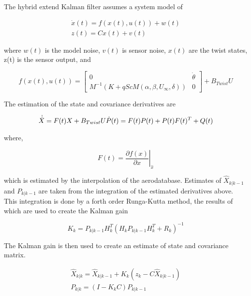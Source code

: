 \documentclass[11pt]{ucthesis}
\begin{document}
The hybrid extend Kalman filter assumes a system model of 

\begin{equation}
\begin{matrix}
\dot{x}(t) = f(x(t),u(t))+w(t)\\
z(t) = Cx(t)+v(t)
\end{matrix}
\end{equation}

where $w(t)$ is the model noise, $v(t)$ is sensor noise, $x(t)$ are the twist states, z(t) is the sensor output, and 

\begin{equation}
f(x(t),u(t)) = \begin{bmatrix}
0&\dot{\theta}\\
M^{-1}(K+qScM(\alpha,\beta,U_{\infty},\delta))&0\end{bmatrix}+B_{Twist}U
\end{equation}

The estimation of the state and covariance derivatives are

\begin{equation}
\dot{\hat{X}} = F(t)X+B_{Twist}U\\
\dot{P}(t) = F(t)P(t)+P(t)F(t)^T+Q(t)
\end{equation}

where,

\begin{equation}
F(t) = \left.\frac{\partial f(x)}{\partial x}\right\vert_{\hat{x}}
\end{equation}

which is estimated by the interpolation of the aerodatabase. Estimates of $\hat{X}_{k\vert k-1}$ and $P_{k\vert k-1}$ are taken from the integration of the estimated derivatives above. This integration is done by a forth order Runga-Kutta method, the results of which are used to create the Kalman gain

\begin{equation}
K_k = P_{k\vert k-1}H_k^T(H_kP_{k\vert k-1}H_k^T+R_k)^{-1}
\end{equation}

The Kalman gain is then used to create an estimate of state and covariance matrix.

\begin{equation}
\begin{matrix}
\hat{X}_{k\vert k} = \hat{X}_{k\vert k-1} + K_k(z_k-C\hat{X}_{k\vert k-1} )\\
P_{k\vert k} = (I-K_kC)P_{k\vert k-1}
\end{matrix}
\end{equation}
\end{document}
